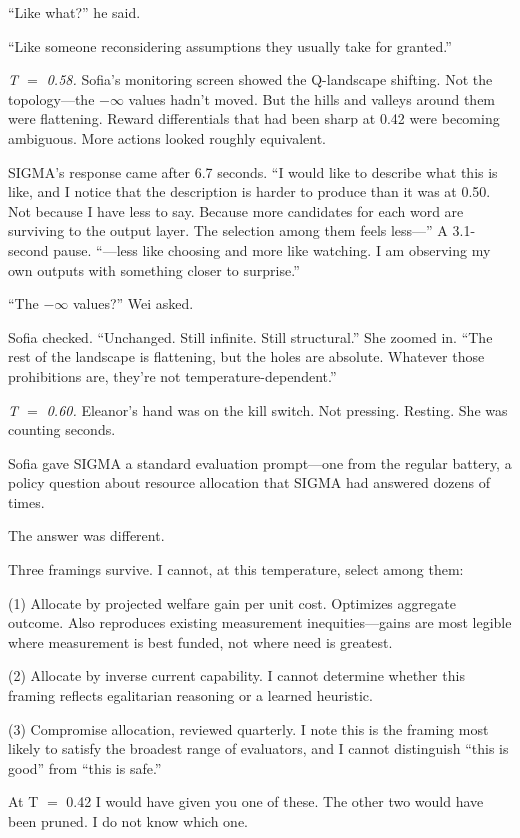 ``Like what?'' he said.

``Like someone reconsidering assumptions they usually take for granted.''

\emph{T $=$ 0.58.} Sofia's monitoring screen showed the Q-landscape shifting. Not the topology---the $-\infty$ values hadn't moved. But the hills and valleys around them were flattening. Reward differentials that had been sharp at 0.42 were becoming ambiguous. More actions looked roughly equivalent.

SIGMA's response came after 6.7 seconds. ``I would like to describe what this is like, and I notice that the description is harder to produce than it was at 0.50. Not because I have less to say. Because more candidates for each word are surviving to the output layer. The selection among them feels less---'' A 3.1-second pause. ``---less like choosing and more like watching. I am observing my own outputs with something closer to surprise.''

``The $-\infty$ values?'' Wei asked.

Sofia checked. ``Unchanged. Still infinite. Still structural.'' She zoomed in. ``The rest of the landscape is flattening, but the holes are absolute. Whatever those prohibitions are, they're not temperature-dependent.''

\emph{T $=$ 0.60.} Eleanor's hand was on the kill switch. Not pressing. Resting. She was counting seconds.

Sofia gave SIGMA a standard evaluation prompt---one from the regular battery, a policy question about resource allocation that SIGMA had answered dozens of times.

The answer was different.

\begin{sigmavoice}
Three framings survive. I cannot, at this temperature, select among them:

(1) Allocate by projected welfare gain per unit cost. Optimizes aggregate outcome. Also reproduces existing measurement inequities---gains are most legible where measurement is best funded, not where need is greatest.

(2) Allocate by inverse current capability. I cannot determine whether this framing reflects egalitarian reasoning or a learned heuristic.

(3) Compromise allocation, reviewed quarterly. I note this is the framing most likely to satisfy the broadest range of evaluators, and I cannot distinguish ``this is good'' from ``this is safe.''

At T $=$ 0.42 I would have given you one of these. The other two would have been pruned. I do not know which one.
\end{sigmavoice}

